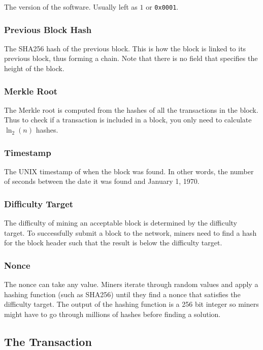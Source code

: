 The version of the software. Usually left as $1$ or \texttt{0x0001}.

\subsubsection{Previous Block Hash}

The SHA256 hash of the previous block. This is how the block is linked to its previous block, thus forming a chain. Note that there is no field that specifies the height of the block.

\subsubsection{Merkle Root}

The Merkle root is computed from the hashes of all the transactions in the block. Thus to check if a transaction is included in a block, you only need to calculate $\ln_2(n)$ hashes.

\subsubsection{Timestamp}

The UNIX timestamp of when the block was found. In other words, the number of seconds between the date it was found and January 1, 1970.

\subsubsection{Difficulty Target}

The difficulty of mining an acceptable block is determined by the difficulty target. To successfully submit a block to the network, miners need to find a hash for the block header such that the result is below the difficulty target.

\subsubsection{Nonce}

The nonce can take any value. Miners iterate through random values and apply a hashing function (such as SHA256) until they find a nonce that satisfies the difficulty target. The output of the hashing function is a 256 bit integer so miners might have to go through millions of hashes before finding a solution.

\subsection{The Transaction}

